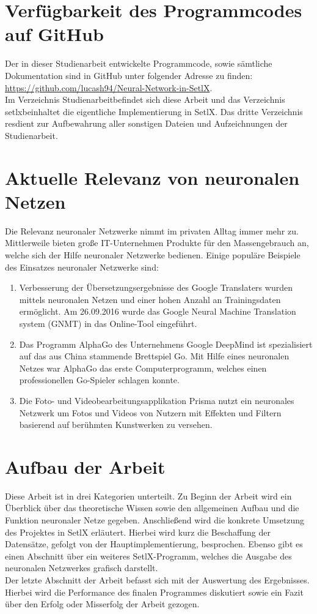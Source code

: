 \section{Verfügbarkeit des Programmcodes auf GitHub}
Der in dieser Studienarbeit entwickelte Programmcode, sowie sämtliche Dokumentation sind in GitHub unter folgender Adresse zu finden:
\\[0.2cm]
\hspace*{1.3cm}
\href{https://github.com/lucash94/Neural-Network-in-SetlX/}{https://github.com/lucash94/Neural-Network-in-SetlX}.
\\[0.2cm]
Im Verzeichnis \glqq Studienarbeit\grqq befindet sich diese Arbeit und das Verzeichnis \glqq setlx\grqq beinhaltet die eigentliche Implementierung in SetlX. Das dritte Verzeichnis \glqq res\grqq dient zur Aufbewahrung aller sonstigen Dateien und Aufzeichnungen der Studienarbeit.

\section{Aktuelle Relevanz von neuronalen Netzen}
Die Relevanz neuronaler Netzwerke nimmt im privaten Alltag immer mehr zu. Mittlerweile bieten große IT-Unternehmen Produkte für den Massengebrauch an, welche sich der Hilfe neuronaler Netzwerke bedienen. Einige populäre Beispiele des Einsatzes neuronaler Netzwerke sind:
\begin{enumerate}
\item Verbesserung der Übersetzungsergebnisse des Google Translaters wurden mittels neuronalen Netzen und einer hohen Anzahl an Trainingsdaten ermöglicht. Am 26.09.2016 wurde das Google Neural Machine Translation system (GNMT) in das Online-Tool eingeführt. \cite{gnmt:2017}
\item Das Programm AlphaGo des Unternehmens Google DeepMind ist spezialisiert auf das aus China stammende Brettspiel Go. Mit Hilfe eines neuronalen Netzes war AlphaGo das erste Computerprogramm, welches einen professionellen Go-Spieler schlagen konnte. \cite{alphago:2017}
\item Die Foto- und Videobearbeitungsapplikation Prisma nutzt ein neuronales Netzwerk um Fotos und Videos von Nutzern mit Effekten und Filtern basierend auf berühmten Kunstwerken zu versehen. \cite{prismaai:2017}
\end{enumerate}

\section{Aufbau der Arbeit}
Diese Arbeit ist in drei Kategorien unterteilt. Zu Beginn der Arbeit wird ein Überblick über das theoretische Wissen sowie den allgemeinen Aufbau und die Funktion neuronaler Netze gegeben. Anschließend wird die konkrete Umsetzung des Projektes in SetlX erläutert. Hierbei wird kurz die Beschaffung der Datensätze, gefolgt von der Hauptimplementierung, besprochen. Ebenso gibt es einen Abschnitt über ein weiteres SetlX-Programm, welches die Ausgabe des neuronalen Netzwerkes grafisch darstellt. \\
Der letzte Abschnitt der Arbeit befasst sich mit der Auswertung des Ergebnisses. Hierbei wird die Performance des finalen Programmes diskutiert sowie ein Fazit über den Erfolg oder Misserfolg der Arbeit gezogen.